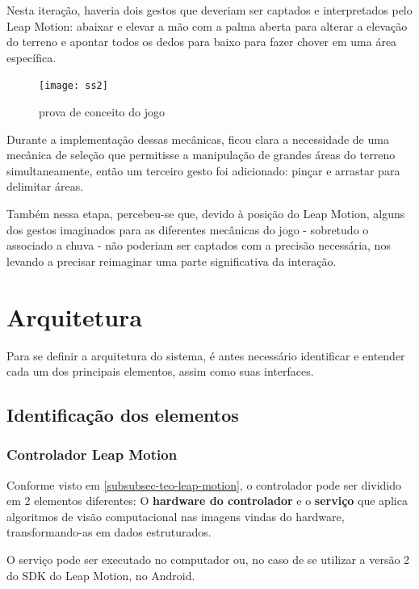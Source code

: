 Nesta iteração, haveria dois gestos que deveriam ser captados e interpretados pelo Leap Motion: abaixar e elevar a mão com a palma aberta para alterar a elevação do terreno e apontar todos os dedos para baixo para fazer chover em uma área específica.

\begin{figure}[h]
	\centering
	\texttt{[image: ss2]}
	\caption{prova de conceito do jogo}
\end{figure}

Durante a implementação dessas mecânicas, ficou clara a necessidade de uma mecânica de seleção que permitisse a manipulação de grandes áreas do terreno simultaneamente, então um terceiro gesto foi adicionado: pinçar e arrastar para delimitar áreas.

Também nessa etapa, percebeu-se que, devido à posição do Leap Motion, alguns dos gestos imaginados para as diferentes mecânicas do jogo - sobretudo o associado a chuva - não poderiam ser captados com a precisão necessária, nos levando a precisar reimaginar uma parte significativa da interação.


\section{Arquitetura}\label{sec-desenvolvimento-arquitetura}

Para se definir a arquitetura do sistema, é antes necessário identificar e entender cada um dos principais elementos, assim como suas interfaces.

\subsection{Identificação dos elementos}\label{subsec-identificacao-elementos}

\subsubsection{Controlador Leap Motion}\label{subsubsec-elemento-leapmotion}

Conforme visto em \ref{subsubsec-teo-leap-motion}, o controlador pode ser dividido em 2 elementos diferentes: O \textbf{hardware do controlador} e o \textbf{serviço} que aplica algoritmos de visão computacional nas imagens vindas do hardware, transformando-as em dados estruturados.

O serviço pode ser executado no computador ou, no caso de se utilizar a versão 2 do SDK do Leap Motion, no Android.

